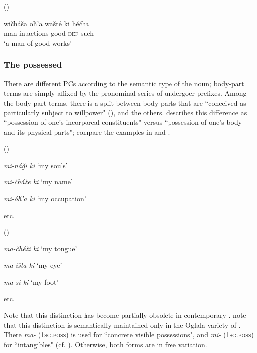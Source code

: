\documentclass[output=paper]{LSP/langsci}
\begin{document}
\ea {} (\citealt[93]{Buechel1939}) \label{lakotagoodworks}

\gll wi\v{c}háša o\v{h}'a     wašté ki     hé\v{c}ha \\
man       in.actions good  \textsc{def} such \\
\glt `a man of good works'
\z

\subsubsection{The possessed}
There are different PCs according to the semantic type of the  noun; body-part terms are simply affixed by the pronominal series of undergoer prefixes. Among the body-part terms, there is a split between body parts that are ``conceived as particularly subject to willpower" (\citealt[128]{BoasDeloria1941}), and the others. \citet[100]{Buechel1939} describes this difference as ``possession of one's incorporeal constituents" versus ``possession of one's body and its physical parts"; compare the examples in  and .

\ea {} (\citealt[101]{Buechel1939}) \label{lakotaincorporeal}

\textit{mi-ná\v{g}i ki } \hspace{2.11em}		`my souls'

\textit{mi-\v{c}há\v{z}e  ki } \hspace{1.85em} `my name'

\textit{mi-ó\v{h}'a ki}	\hspace{2em}		`my occupation'

etc.

\ex {} (\citealt[100]{Buechel1939}) \label{lakotabody}

\textit{ma-\v{c}hé\v{z}i ki } \hspace{1.7em}	`my tongue'

\textit{ma-íšta ki }	 \hspace{2.11em}	`my eye'

\textit{ma-sí ki }		 \hspace{3.02em}	`my foot'

etc.
\z

Note that this distinction has become partially obsolete in contemporary . \citet[458]{RoodTaylor1996} note that this distinction is semantically maintained only in the Oglala variety of . There \textit{ma-} (\textsc{1sg.poss}) is used for ``concrete visible possessions", and \textit{mi-} (\textsc{1sg.poss}) for ``intangibles" (cf. \citealt[458]{RoodTaylor1996}). Otherwise, both forms are in free variation.
\end{document}

